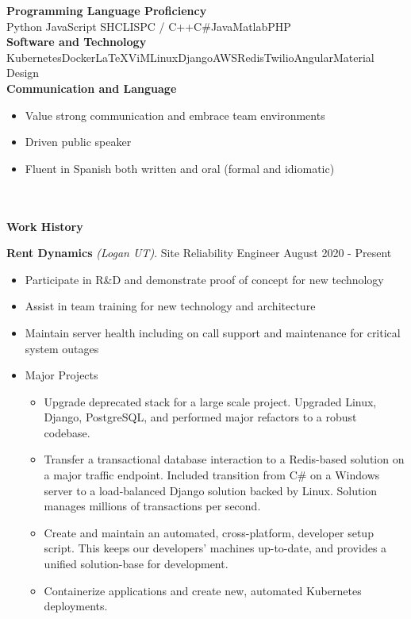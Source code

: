 \documentclass[letterpaper,11pt]{article}
\begin{document}
\textbf{Programming Language Proficiency} \\
Python \hfill JavaScript \hfill SH\hfill CLISP\hfill C / C++\hfill C\#\hfill Java\hfill Matlab\hfill PHP\\

\textbf{Software and Technology}\\
Kubernetes\hfill Docker\hfill \LaTeX\hfill ViM\hfill Linux\hfill Django\hfill AWS\hfill Redis\hfill Twilio\hfill Angular\hfill Material Design\\

\noindent\textbf{Communication and Language}
\begin{itemize}[noitemsep,topsep=0pt]
	\item Value strong communication and embrace team environments
	\item Driven public speaker
	\item Fluent in Spanish both written and oral (formal and idiomatic)
\end{itemize}


\begin{Large}\textbf{\\\\Work History}\end{Large}

\textbf{Rent Dynamics} \textit{(Logan UT)}. Site Reliability Engineer \hfill August 2020 - Present
\begin{itemize}[noitemsep,topsep=0pt]
	\item Participate in R\&D and demonstrate proof of concept for new technology
	\item Assist in team training for new technology and architecture
	\item Maintain server health including on call support and maintenance for critical system outages
	\item Major Projects \begin{itemize}[noitemsep, topsep=0pt]
		\item Upgrade deprecated stack for a large scale project. Upgraded Linux, Django, PostgreSQL, and performed major refactors to a robust codebase.
		\item Transfer a transactional database interaction to a Redis-based solution on a major traffic endpoint. Included transition from C\# on a Windows server to a load-balanced Django solution backed by Linux. Solution manages millions of transactions per second.
		\item Create and maintain an automated, cross-platform, developer setup script. This keeps our developers' machines up-to-date, and provides a unified solution-base for development.
		\item Containerize applications and create new, automated Kubernetes deployments.\\
	\end{itemize}
\end{itemize}
\end{document}

